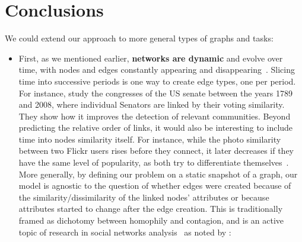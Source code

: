 \section{Conclusions}
\label{sec:edge_conc}

We could extend our approach to more general types of graphs and tasks:

\begin{itemize}[leftmargin=*]

  \item First, as we mentioned earlier, \textbf{networks are dynamic} and evolve over time, with
    nodes and edges constantly appearing and disappearing~\autocite{networkEvolution14}. Slicing
    time into successive periods is one way to create edge types, one per period. For instance,
    \textcite{TimedUSSenate10} study the  congresses of the US senate between the years 1789
    and 2008, where  individual Senators are linked by their voting similarity. They show
    how it improves the detection of relevant communities. Beyond predicting the relative order of
    links, it would also be interesting to include time into nodes similarity itself.
    For instance, while the photo similarity between two Flickr users rises before they connect, it
    later decreases if they have the same level of popularity, as both try to differentiate
    themselves~\autocite{dynamicFlickr13}.
    More generally, by defining our problem on a static snapshot of a graph, our model is agnostic
    to the question of whether edges were created because of the similarity/dissimilarity of
    the linked nodes' attributes or because attributes started to change after the edge creation.
    This is traditionally framed as dichotomy between homophily and contagion, and is an active topic
    of research in social networks analysis~\autocites{InfluenceVsHomo08}{ConfoundedHomophily11} as
    noted by \textcite{OSNreview14}: 


\end{itemize}

